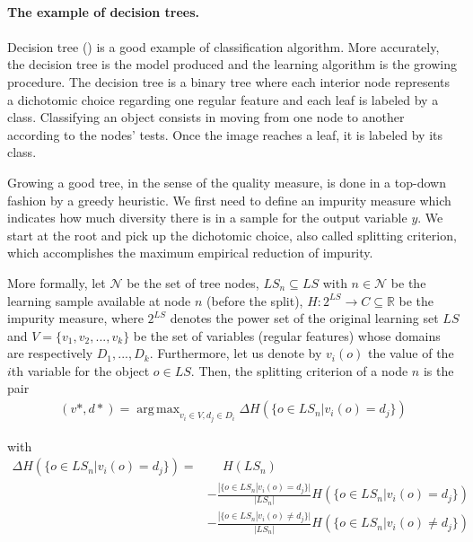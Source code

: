 \documentclass[a4paper]{report}
\DeclareMathOperator*{\argmax}{arg\,max}
\begin{document}
\begin{leftbar}
	\paragraph{The example of decision trees.}
	\paragraph{}
	Decision tree (\cite{decisiontrees}) is a good example of classification algorithm. More accurately, the decision tree is the model produced and the learning algorithm is the growing procedure. The decision tree is a binary tree where each interior node represents a dichotomic choice regarding one regular feature and each leaf is labeled by a class. Classifying an object consists in moving from one node to another according to the nodes' tests. Once the image reaches a leaf, it is labeled by its class.
	\par
	Growing a good tree, in the sense of the quality measure, is done in a top-down fashion by a greedy heuristic. We first need to define an impurity measure which indicates how much diversity there is in a sample for the output variable $y$. We start at the root and pick up the dichotomic choice, also called splitting criterion, which accomplishes the maximum empirical reduction of impurity. 
	
	More formally, let $\mathcal{N}$ be the set of tree nodes, $LS_n \subseteq  LS$ with $n \in \mathcal{N}$ be the learning sample available at node $n$ (before the split), $H : 2^{LS} \rightarrow C \subseteq \mathbb{R}$ be the impurity measure, where $2^{LS}$ denotes the power set of the original learning set $LS$ and $V = \{v_1, v_2, ..., v_k\}$ be the set of variables (regular features) whose domains are respectively $D_1, ..., D_k$. Furthermore, let us denote by $v_i(o)$ the value of the $i$th variable for the object $o \in LS$.
	Then, the splitting criterion of a node $n$ is the pair 
	\begin{align*}
		(v*, d*) = \argmax_{v_i \in V, d_j \in D_i} \Delta H(\{o \in LS_n| v_i(o) = d_j\}) 
	\end{align*}
	
	with
	\begin{align*}
	 \Delta H(\{o \in LS_n| v_i(o) = d_j\}) = &\phantom{-} H(LS_n) \\
																					  &- \frac{|\{o \in LS_n| v_i(o) = d_j\}|}{|LS_n|} H(\{o \in LS_n| v_i(o) = d_j\})  \\
																						&- \frac{|\{o \in LS_n| v_i(o) \neq d_j\}|}{|LS_n|} H(\{o \in LS_n| v_i(o) \neq d_j\})
	\end{align*}
	

\end{leftbar}
\end{document}
